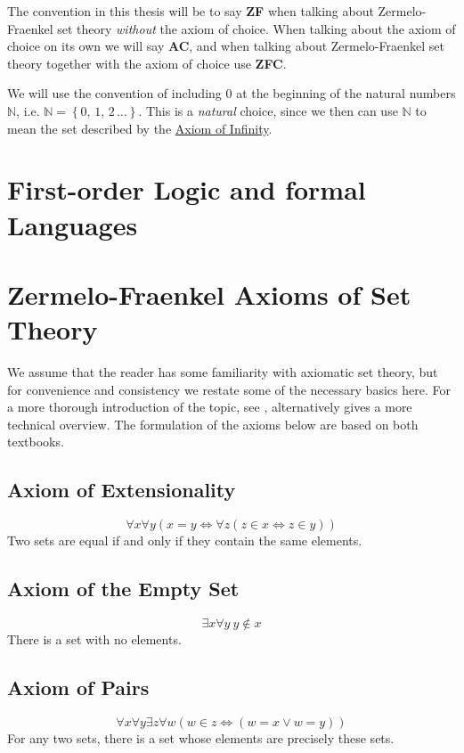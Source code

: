 \documentclass[../../main.tex]{subfiles}
\begin{document}
The convention in this thesis will be to say \textbf{ZF} when talking about Zermelo-Fraenkel set theory \textit{without} the axiom of choice.
When talking about the axiom of choice on its own we will say \textbf{AC}, and when talking about Zermelo-Fraenkel set theory together with the axiom of choice use \textbf{ZFC}.

We will use the convention of including $0$ at the beginning of the natural numbers $\mathbb{N}$, i.e. $\mathbb{N} = \left\{0, \, 1, \, 2\, \ldots\right\}$.
This is a \textit{natural} choice, since we then can use $\mathbb{N}$ to mean the set described by the \hyperref[ZF7]{Axiom of Infinity}.

\section{First-order Logic and formal Languages}

\section{Zermelo-Fraenkel Axioms of Set Theory}
We assume that the reader has some familiarity with axiomatic set theory, but for convenience and consistency we restate some of the necessary basics here. %
For a more thorough introduction of the topic, see \cite[4.3-4.5]{Gol17}, alternatively \cite[1.1]{Jec78} gives a more technical overview.
The formulation of the axioms below are based on both textbooks.

\subsection{Axiom of Extensionality}
$$\forall x \forall y \left(x = y \iff \forall z \left(z \in x \iff z \in y\right) \right)$$
Two sets are equal if and only if they contain the same elements.

\subsection{Axiom of the Empty Set}
$$\exists x \forall y \ y \notin x$$
There is a set with no elements.

\subsection{Axiom of Pairs}
$$\forall x \forall y \exists z \forall w \left( w \in z \iff \left(w = x \vee w = y \right)\right)$$
For any two sets, there is a set whose elements are precisely these sets.
\end{document}
